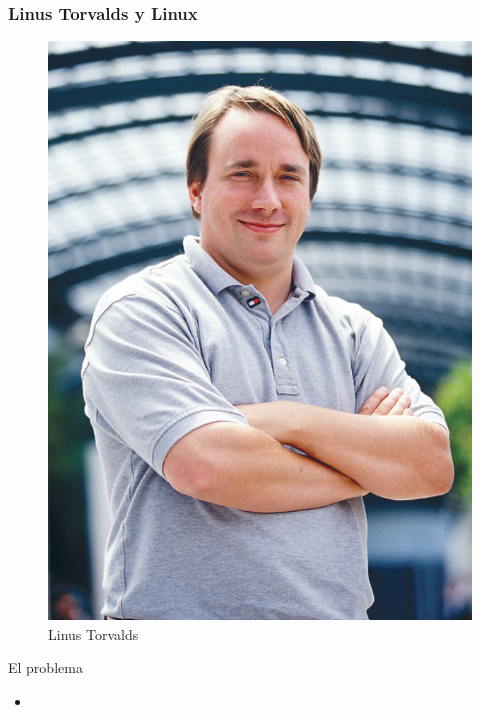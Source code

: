 \documentclass[hyperref={colorlinks}]{beamer}
\begin{document}
\begin{frame}
    \frametitle{Linus Torvalds y Linux}

    \begin{minipage}{.4\linewidth}
    \begin{figure}
        \includegraphics[width=.9\linewidth]{figs/torvalds.jpeg}
        \caption{Linus Torvalds}
        \end{figure}
    \end{minipage}
    \begin{minipage}{.55\linewidth}
        \begin{block}{El problema}
            \begin{itemize}
                \item

\end{itemize}
\end{block}
\end{minipage}
\end{frame}
\end{document}
